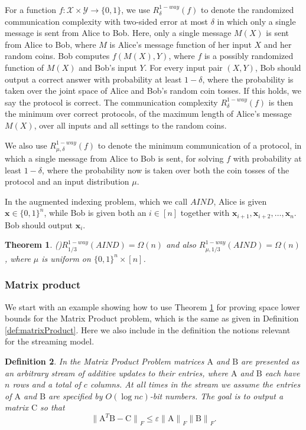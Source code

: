 \documentclass[11pt]{article}
\newtheorem{theorem}{Theorem}
\newtheorem{definition}[theorem]{Definition}
\newcommand{\mat}[1]{{\ensuremath{\bm{\mathrm{#1}}}}}
\def\matA{\mat{A}}
\def\matB{\mat{B}}
\def\matC{\mat{C}}
\def\x{{\mathbf x}}
\newcommand{\normF}[1]{{\| #1 \|}_F}
\begin{document}
For a function $f: \mathcal{X} \times 
\mathcal{Y} \rightarrow \{0,1\}$, we use 
$R_{\delta}^{1-way}(f)$ to denote the randomized communication complexity with 
two-sided error at most $\delta$ in which only a single message is sent from 
Alice to Bob. Here, only a single message $M(X)$ is sent from Alice to Bob,
where $M$ is Alice's message function of her input $X$ and her random coins. Bob
computes $f(M(X), Y)$, where $f$ is a possibly randomized function of $M(X)$
and Bob's input $Y$. For every input pair $(X,Y)$, Bob should output a correct
answer with probability at least $1-\delta$, where the probability is taken over the joint
space of Alice and Bob's random coin tosses. If this holds, we say the protocol is correct.
The communication complexity $R_{\delta}^{1-way}(f)$ is then the minimum over correct protocols, 
of the maximum length of Alice's message $M(X)$, over all inputs and all settings to the 
random coins. 

We also use $R_{\mu, \delta}^{1-way}(f)$ to denote the minimum 
communication of a protocol, in which a single message from Alice to Bob is 
sent, for solving $f$ with probability at least $1-\delta$, where the 
probability now is taken over both the coin tosses of the protocol and an input 
distribution $\mu$.

In the augmented indexing problem, which we call 
$AIND$, Alice is given $\x \in \{0,1\}^n$, while Bob is given 
both an $i \in [n]$ together with $\x_{i+1}, \x_{i+2}, \ldots, \x_n$. Bob should 
output $\x_i$.
\begin{theorem}(\cite{MNSW98})\label{thm:mnsw}
$R_{1/3}^{1-way}(AIND) = \Omega(n)$ and also
$R_{\mu, 1/3}^{1-way}(AIND) = \Omega(n)$,
where $\mu$ is uniform on $\{0,1\}^n \times [n]$.
\end{theorem}

\subsubsection{Matrix product}
We start with an example showing how to use Theorem \ref{thm:mnsw} for proving
space lower bounds for the {\sf Matrix Product} problem, which is the same
as given in Definition \ref{def:matrixProduct}. Here we also include in the definition
the notions relevant for the streaming model.

\begin{definition}\label{def:matrixProduct2}
In the {\em Matrix Product} Problem matrices $\matA$ and $\matB$ are presented as an arbitrary stream of
additive updates to their entries, where $\matA$ and $\matB$ each have $n$ rows and a 
total of $c$ columns.  At all times in the stream we assume the entries of $\matA$ and $\matB$
are specified by $O(\log nc)$-bit numbers.
The goal is to output a 
matrix $\matC$ so that 
\[
\normF{\matA^T\matB - \matC} \leq \varepsilon \normF{\matA} \normF{\matB}.
\]
\end{definition}
\end{document}
